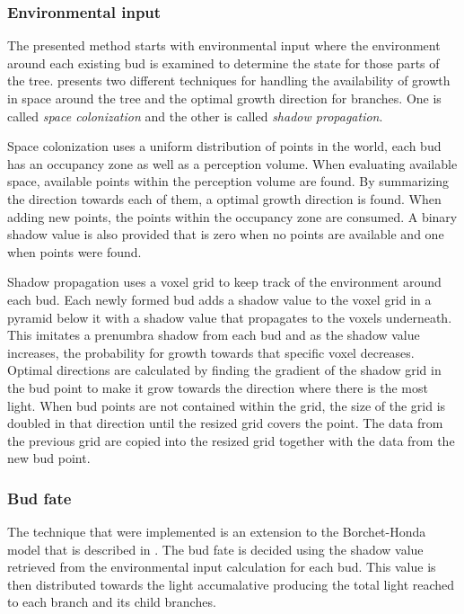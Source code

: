 \documentclass[11pt]{article} %
\begin{document}
\subsubsection{Environmental input}
The presented method starts with environmental input where the environment around each existing bud is examined to determine the state for those parts of the tree.
\citet{palubicki} presents two different techniques for handling the availability of growth in space around the tree and the optimal growth direction for branches.
One is called \emph{space colonization} and the other is called \emph{shadow propagation}.

Space colonization uses a uniform distribution of points in the world, each bud has an occupancy zone as well as a perception volume.
When evaluating available space, available points within the perception volume are found.
By summarizing the direction towards each of them, a optimal growth direction is found.
When adding new points, the points within the occupancy zone are consumed.
A binary shadow value is also provided that is zero when no points are available and one when points were found.

Shadow propagation uses a voxel grid to keep track of the environment around each bud.
Each newly formed bud adds a shadow value to the voxel grid in a pyramid below it with a shadow value that propagates to the voxels underneath.
This imitates a prenumbra shadow from each bud and as the shadow value increases, the probability for growth towards that specific voxel decreases.
Optimal directions are calculated by finding the gradient of the shadow grid in the bud point to make it grow towards the direction where there is the most light.
When bud points are not contained within the grid, the size of the grid is doubled in that direction until the resized grid covers the point.
The data from the previous grid are copied into the resized grid together with the data from the new bud point.

\subsubsection{Bud fate}
The technique that were implemented is an extension to the Borchet-Honda model that is described in \citet{palubicki}.
The bud fate is decided using the shadow value retrieved from the environmental input calculation for each bud.
This value is then distributed towards the light accumalative producing the total light reached to each branch and its child branches.
\end{document}
